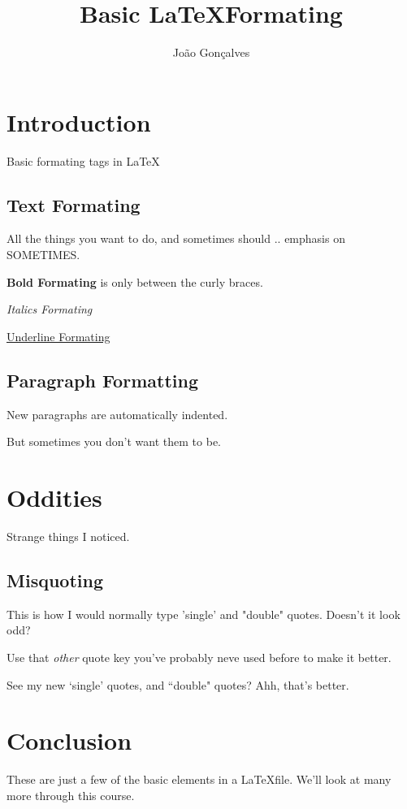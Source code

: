 \documentclass{article}
\title{Basic \LaTeX Formating}
\author{João Gonçalves}
\date{}
\begin{document}
\maketitle

\section{Introduction}
Basic formating tags in \LaTeX

\subsection{Text Formating}

All the things you want to do, and sometimes should .. emphasis on SOMETIMES.

\textbf{Bold Formating} is only between the curly braces.

\emph{Italics Formating}

\underline{Underline Formating}

\subsection{Paragraph Formatting}

New paragraphs are automatically indented.

\noindent But sometimes you don't want them to be.

\section{Oddities}

Strange things I noticed.

\subsection{Misquoting}

This is how I would normally type 'single' and "double" quotes. Doesn't it look odd?

\noindent Use that \emph{other} quote key you've probably neve used before to make it better.

\noindent See my new `single' quotes, and ``double" quotes? Ahh, that's better.

\section{Conclusion}

These are  just a few of the basic elements in a \LaTeX file. We'll look at many more through this course.
\end{document}
